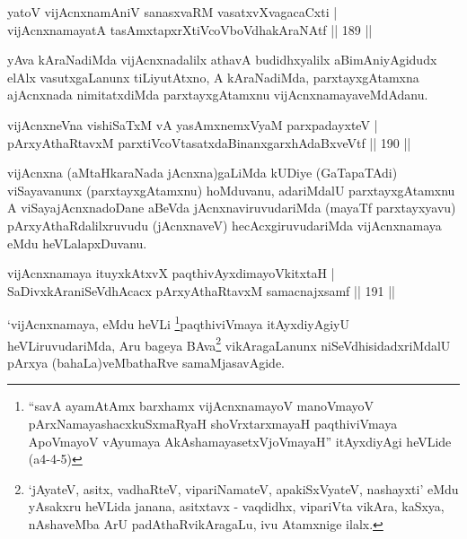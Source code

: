 \begin{shl}
yatoV vijAcnxnamAniV sanasxvaRM vasatxvXvagacaCxti |\\
vijAcnxnamayatA tasAmxtapxrXtiVcoV\s boVdhakAraNAtf \hfill || 189 ||
\end{shl}

\begin{artha}
yAva kAraNadiMda vijAcnxnadalilx athavA budidhxyalilx aBimAniyAgidudx elAlx vasutxgaLanunx tiLiyutAtxno, A kAraNadiMda, parxtayxgAtamxna ajAcnxnada nimitatxdiMda parxtayxgAtamxnu vijAcnxnamayaveMdAdanu.
\end{artha}


\begin{shl}
vijAcnxneVna vishiSaTxM vA yasAmxnemxVyaM parxpadayxteV |\\
pArxyAthaRtavxM parxtiVcoV\s tasatxdaBinanxgarxhAdaBxveVtf \hfill || 190 ||
\end{shl}

\begin{artha}
vijAcnxna (aMtaHkaraNada jAcnxna)gaLiMda kUDiye (GaTapaTAdi) viSayavanunx (parxtayxgAtamxnu) hoMduvanu, adariMdalU parxtayxgAtamxnu A viSayajAcnxnadoDane aBeVda jAcnxnaviruvudariMda (mayaTf parxtayxyavu) pArxyAthaRdalilxruvudu (jAcnxnaveV) hecAcxgiruvudariMda vijAcnxnamaya eMdu heVLalapxDuvanu.
\end{artha}

\begin{shl}
vijAcnxnamaya ituyxkAtxvX paqthivAyxdimayoVkitxtaH |\\
SaDivxkAraniSeVdhAcacx pArxyAthaRtavxM samacnajxsamf \hfill || 191 ||
\end{shl}

\begin{artha}
`vijAcnxnamaya, eMdu heVLi \footnote{``savA ayamAtAmx barxhamx vijAcnxnamayoV manoVmayoV pArxNamayashacxkuSxmaRyaH shoVrxtarxmayaH paqthiviVmaya ApoVmayoV vAyumaya AkAshamayasetxVjoVmayaH'' itAyxdiyAgi heVLide (a4-4-5)}paqthiviVmaya itAyxdiyAgiyU heVLiruvudariMda, Aru bageya BAva\footnote{`jAyateV, asitx, vadhaRteV, vipariNamateV, apakiSxVyateV, nashayxti' eMdu yAsakxru heVLida janana, asitxtavx - vaqdidhx, vipariVta vikAra, kaSxya, nAshaveMba ArU padAthaRvikAragaLu, ivu Atamxnige ilalx.} vikAragaLanunx niSeVdhisidadxriMdalU pArxya (bahaLa)veMbathaRve samaMjasavAgide.
\end{artha}


